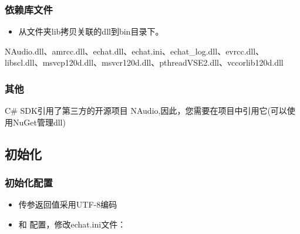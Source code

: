 \documentclass[letterpaper,10pt,english]{sphinxmanual}
\begin{document}
\subsubsection{依赖库文件}
\label{\detokenize{csharp:id6}}\begin{itemize}
\item {} 
从文件夹lib拷贝关联的dll到bin目录下。

\end{itemize}

NAudio.dll、amrcc.dll、echat.dll、echat.ini、echat\_log.dll、evrcc.dll、libscl.dll、msvcp120d.dll、msvcr120d.dll、pthreadVSE2.dll、vccorlib120d.dll


\subsubsection{其他}
\label{\detokenize{csharp:id7}}
C\# SDK引用了第三方的开源项目
NAudio,因此，您需要在项目中引用它(可以使用NuGet管理dll)


\subsection{初始化}
\label{\detokenize{csharp:id8}}

\subsubsection{初始化配置}
\label{\detokenize{csharp:id9}}\begin{itemize}
\item {} 
传参返回值采用UTF-8编码

\item {} 
 和  配置，修改echat.ini文件：

%
\begin{sphinxVerbatim}[commandchars=\\\{\}]
\PYG{p}{[}\PYG{p}{]}
  
\PYG{p}{[}\PYG{p}{]}
  
\end{sphinxVerbatim}

\end{itemize}
\end{document}
